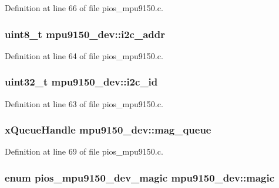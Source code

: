 \-Definition at line 66 of file pios\-\_\-mpu9150.\-c.

\hypertarget{structmpu9150__dev_a2fbefbe5feaf41acd2fa2f38d9659d9b}{
\subsubsection[{i2c\-\_\-addr}]{\setlength{\rightskip}{0pt plus 5cm}uint8\-\_\-t {\bf mpu9150\-\_\-dev\-::i2c\-\_\-addr}}}\label{structmpu9150__dev_a2fbefbe5feaf41acd2fa2f38d9659d9b}


\-Definition at line 64 of file pios\-\_\-mpu9150.\-c.

\hypertarget{structmpu9150__dev_a21914e4ea5e4f5c302527a1c792612ae}{
\subsubsection[{i2c\-\_\-id}]{\setlength{\rightskip}{0pt plus 5cm}uint32\-\_\-t {\bf mpu9150\-\_\-dev\-::i2c\-\_\-id}}}\label{structmpu9150__dev_a21914e4ea5e4f5c302527a1c792612ae}


\-Definition at line 63 of file pios\-\_\-mpu9150.\-c.

\hypertarget{structmpu9150__dev_aaa1a539bd8e174c5a35c1abbc58c7c14}{
\subsubsection[{mag\-\_\-queue}]{\setlength{\rightskip}{0pt plus 5cm}x\-Queue\-Handle {\bf mpu9150\-\_\-dev\-::mag\-\_\-queue}}}\label{structmpu9150__dev_aaa1a539bd8e174c5a35c1abbc58c7c14}


\-Definition at line 69 of file pios\-\_\-mpu9150.\-c.

\hypertarget{structmpu9150__dev_a1df6dd07def8299af2a38817a216e8e2}{
\subsubsection[{magic}]{\setlength{\rightskip}{0pt plus 5cm}enum {\bf pios\-\_\-mpu9150\-\_\-dev\-\_\-magic} {\bf mpu9150\-\_\-dev\-::magic}}}\label{structmpu9150__dev_a1df6dd07def8299af2a38817a216e8e2}


